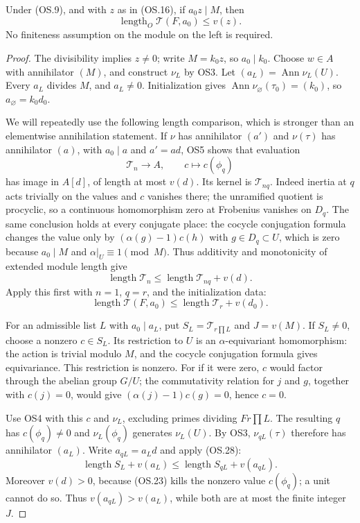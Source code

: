 \begin{proposition}
Under (OS.9), and with $z$ as in (OS.16), if
$a_0z\mid M$, then
\[
              \operatorname{length}_O\mathcal T(F,a_0)\le v(z).
 \tag{OS.27}
\]
No finiteness assumption on the module on the left is required.
\end{proposition}
\begin{proof}
The divisibility implies $z\ne0$; write $M=k_0z$, so $a_0\mid k_0$.
Choose $w\in A$ with annihilator $(M)$, and construct $\nu_L$
by OS3.  Let $(a_L)=\operatorname{Ann}\nu_L(U)$.
Every $a_L$ divides $M$, and $a_L\ne0$.
Initialization gives $\operatorname{Ann}\nu_\varnothing(\tau_0)=(k_0)$,
so $a_\varnothing=k_0d_0$.

We will repeatedly use the following length comparison, which is
stronger than an elementwise annihilation statement.
If $\nu$ has annihilator $(a')$ and $\nu(\tau)$ has annihilator
$(a)$, with $a_0\mid a$ and $a'=ad$, OS5 shows that evaluation
\[
             \mathcal T_n\longrightarrow A,\qquad
                       c\longmapsto c(\phi_q)
\]
has image in $A[d]$, of length at most $v(d)$.
Its kernel is $\mathcal T_{nq}$.
Indeed inertia at $q$ acts trivially on the values and $c$ vanishes
there; the unramified quotient is procyclic, so a continuous
homomorphism zero at Frobenius vanishes on $D_q$.
The same conclusion holds at every conjugate place: the cocycle
conjugation formula changes the value only by
$(\alpha(g)-1)c(h)$ with $g\in D_q\subset U$, which is zero
because $a_0\mid M$ and $\alpha|_U\equiv1\pmod M$.
Thus additivity and monotonicity of extended module length give
\[
        \operatorname{length}\mathcal T_n
       \le\operatorname{length}\mathcal T_{nq}+v(d).
 \tag{OS.28}
\]
Apply this first with $n=1$, $q=r$, and the initialization data:
\[
 \operatorname{length}\mathcal T(F,a_0)
       \le\operatorname{length}\mathcal T_r+v(d_0).
 \tag{OS.29}
\]

For an admissible list $L$ with $a_0\mid a_L$, put
$S_L=\mathcal T_{r\prod L}$ and $J=v(M)$.
If $S_L\ne0$, choose a nonzero $c\in S_L$.
Its restriction to $U$ is an $\alpha$-equivariant homomorphism:
the action is trivial modulo $M$, and the cocycle conjugation
formula gives equivariance.  This restriction is nonzero.
For if it were zero, $c$ would factor through the abelian group
$G/U$; the commutativity relation for $j$ and $g$, together with
$c(j)=0$, would give $(\alpha(j)-1)c(g)=0$, hence $c=0$.

Use OS4 with this $c$ and $\nu_L$, excluding primes dividing
$Fr\prod L$.  The resulting $q$ has
$c(\phi_q)\ne0$ and $\nu_L(\phi_q)$ generates $\nu_L(U)$.
By OS3, $\nu_{qL}(\tau)$ therefore has annihilator $(a_L)$.
Write $a_{qL}=a_Ld$ and apply (OS.28):
\[
 \operatorname{length}S_L+v(a_L)
       \le\operatorname{length}S_{qL}+v(a_{qL}).
 \tag{OS.30}
\]
Moreover $v(d)>0$, because (OS.23) kills the nonzero value
$c(\phi_q)$; a unit cannot do so.  Thus $v(a_{qL})>v(a_L)$,
while both are at most the finite integer $J$.


\end{proof}
